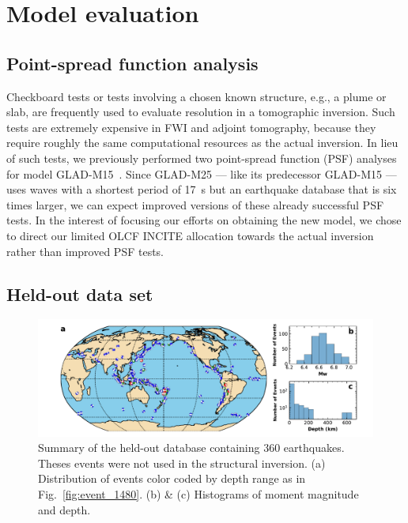 \documentclass[extra,mreferee]{gji}
\begin{document}
\section{Model evaluation}
\label{section:evaluation}


\subsection{Point-spread function analysis}

Checkboard tests or tests involving a chosen known structure, e.g., a plume or slab,
are frequently used to evaluate resolution in a tomographic inversion.
Such tests are extremely expensive in FWI and adjoint tomography, because they
require roughly the same computational resources as the actual inversion.
In lieu of such tests, we previously performed two point-spread function (PSF) analyses
for model GLAD-M15~\citep{bozdaug2016global}.
Since GLAD-M25 --- like its predecessor GLAD-M15 --- uses waves with a shortest period of 17~s
but an earthquake database that is six times larger,
we can expect improved versions of these already successful PSF tests.
In the interest of focusing our efforts on obtaining the new model,
we chose to direct our limited OLCF INCITE allocation towards the actual inversion
rather than improved PSF tests.

\subsection{Held-out data set}

\begin{figure}
  \centering
  \includegraphics[width=\textwidth]{figures/events_360.pdf}
  \caption{\small{Summary of the held-out database containing 360 earthquakes. Theses events were not used in the structural inversion. (a) Distribution of events color coded by depth range as in Fig.~\ref{fig:event_1480}. (b) \& (c) Histograms of moment magnitude and depth.}}
  \label{fig:events_360}
\end{figure}
\end{document}
